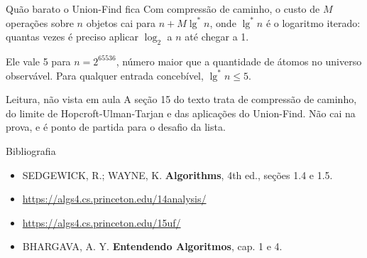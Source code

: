 \documentclass{beamer}
\begin{document}
\begin{frame}{Quão barato o Union-Find fica}
	Com compressão de caminho, o custo de $M$ operações sobre $n$ objetos cai
	para $n + M \lg^{*} n$, onde $\lg^{*} n$ é o logaritmo iterado: quantas
	vezes é preciso aplicar $\log_2$ a $n$ até chegar a 1.

	\vspace{0.3cm}
	Ele vale 5 para $n = 2^{65536}$, número maior que a quantidade de átomos no
	universo observável. Para qualquer entrada concebível, $\lg^{*} n \le 5$.

	\vspace{0.5cm}
	\begin{alertblock}{Leitura, não vista em aula}
		A seção 15 do texto trata de compressão de caminho, do limite de
		Hopcroft-Ulman-Tarjan e das aplicações do Union-Find. Não cai na prova, e
		é ponto de partida para o desafio da lista.
	\end{alertblock}
\end{frame}

\begin{frame}{Bibliografia}
	\begin{itemize}
		\item SEDGEWICK, R.; WAYNE, K. \textbf{Algorithms}, 4th ed., seções 1.4 e 1.5.
		\item \url{https://algs4.cs.princeton.edu/14analysis/}
		\item \url{https://algs4.cs.princeton.edu/15uf/}
		\item BHARGAVA, A. Y. \textbf{Entendendo Algoritmos}, cap. 1 e 4.
	\end{itemize}
\end{frame}
\end{document}
